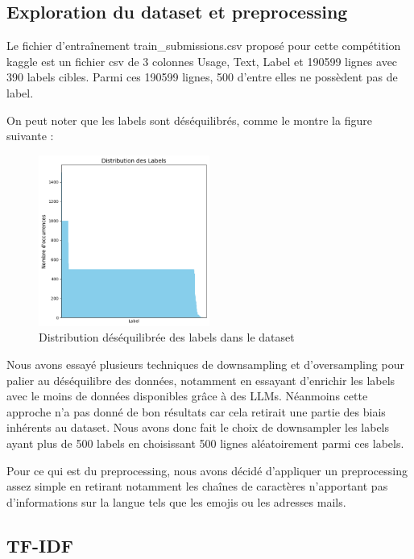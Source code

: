 \subsection{Exploration du dataset et preprocessing}

Le fichier d'entraînement train\_submissions.csv proposé pour cette compétition kaggle est un fichier csv de 3 colonnes Usage, Text, Label et 190599 lignes avec 390 labels cibles. Parmi ces 190599 lignes, 500 d'entre elles ne possèdent pas de label. 

On peut noter que les labels sont déséquilibrés, comme le montre la figure suivante :

\begin{figure}[h!]
    \centering
    \small
    \includegraphics[width=0.5\textwidth]{img/unbalance.png}
    \caption{Distribution déséquilibrée des labels dans le dataset}
    \label{fig:unbalance}
\end{figure}

Nous avons essayé plusieurs techniques de downsampling et d'oversampling pour palier au déséquilibre des données, notamment en essayant d'enrichir les labels avec le moins de données disponibles grâce à des LLMs. Néanmoins cette approche n'a pas donné de bon résultats car cela retirait une partie des biais inhérents au dataset. Nous avons donc fait le choix de downsampler les labels ayant plus de 500 labels en choisissant 500 lignes aléatoirement parmi ces labels.

Pour ce qui est du preprocessing, nous avons décidé d'appliquer un preprocessing assez simple en retirant notamment les chaînes de caractères n'apportant pas d'informations sur la langue tels que les emojis ou les adresses mails.

\subsection{TF-IDF}

